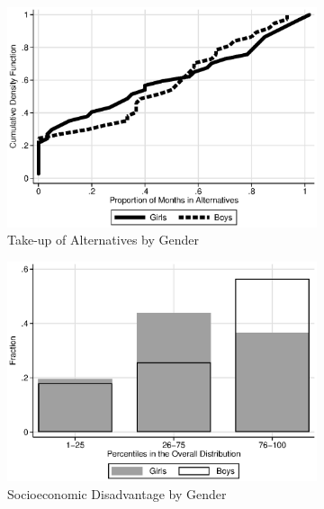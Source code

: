 \begin{figure}
\centering
\caption{Gender and Baseline Socioeconomic Disadvantage in the Control Group} \label{figure:socdis}
\begin{subfigure}[h]{0.4\textwidth}
	\centering
	\caption{Take-up of Alternatives by Gender} \label{figure:altgender}
	\includegraphics[width=\textwidth]{output/abccare_controlcontamination_boysgirls}
\end{subfigure}%
\begin{subfigure}[h]{0.4\textwidth}
	\centering
	\caption{Socioeconomic Disadvantage by Gender} \label{figure:disadgender}
	\includegraphics[width=\textwidth]{output/factorbase_girlsboyscompare}
\end{subfigure}
\begin{subfigure}[h]{0.4\textwidth}

\end{subfigure}
\end{figure}
